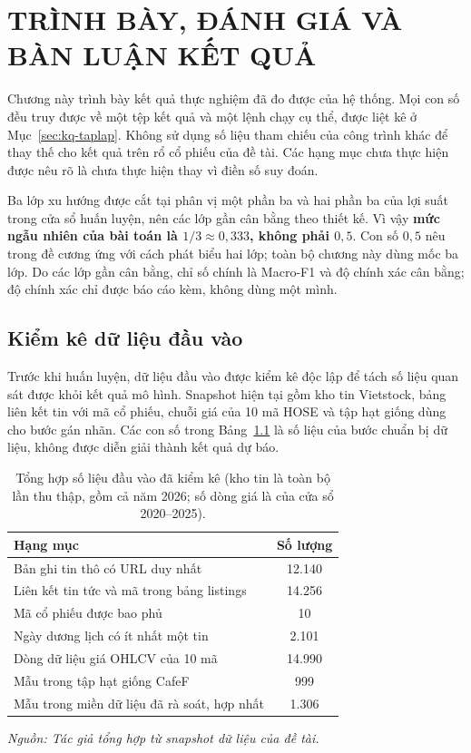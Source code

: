 \chapter{TRÌNH BÀY, ĐÁNH GIÁ VÀ BÀN LUẬN KẾT QUẢ}
\label{ch:ket-qua}

Chương này trình bày kết quả thực nghiệm đã đo được của hệ thống. Mọi con số đều truy
được về một tệp kết quả và một lệnh chạy cụ thể, được liệt kê ở
Mục~\ref{sec:kq-taplap}. Không sử dụng số liệu tham chiếu của công trình khác để thay
thế cho kết quả trên rổ cổ phiếu của đề tài. Các hạng mục chưa thực hiện được nêu rõ là
chưa thực hiện thay vì điền số suy đoán.

Ba lớp xu hướng được cắt tại phân vị một phần ba và hai phần ba của lợi suất trong cửa
sổ huấn luyện, nên các lớp gần cân bằng theo thiết kế. Vì vậy \textbf{mức ngẫu nhiên của
bài toán là $1/3 \approx 0{,}333$, không phải $0{,}5$}. Con số $0{,}5$ nêu trong đề cương
ứng với cách phát biểu hai lớp; toàn bộ chương này dùng mốc ba lớp. Do các lớp gần cân
bằng, chỉ số chính là Macro-F1 và độ chính xác cân bằng; độ chính xác chỉ được báo cáo kèm, không
dùng một mình.

\section{Kiểm kê dữ liệu đầu vào}
\label{sec:kq-snapshot}

Trước khi huấn luyện, dữ liệu đầu vào được kiểm kê độc lập để tách số liệu quan sát
được khỏi kết quả mô hình. Snapshot hiện tại gồm kho tin Vietstock, bảng liên kết tin
với mã cổ phiếu, chuỗi giá của 10 mã HOSE và tập hạt giống dùng cho bước gán nhãn.
Các con số trong Bảng~\ref{tab:kq-snapshot} là số liệu của bước chuẩn bị dữ liệu, không
được diễn giải thành kết quả dự báo.

\begin{table}[H]
  \centering
  \caption{Tổng hợp số liệu đầu vào đã kiểm kê (kho tin là toàn bộ lần thu thập, gồm cả năm 2026; số dòng giá là của cửa sổ 2020--2025).}
  \label{tab:kq-snapshot}
  \begin{tabular}{p{8.8cm} c}
    \toprule
    Hạng mục & Số lượng \\
    \midrule
    Bản ghi tin thô có URL duy nhất & 12.140 \\
    Liên kết tin tức và mã trong bảng listings & 14.256 \\
    Mã cổ phiếu được bao phủ & 10 \\
    Ngày dương lịch có ít nhất một tin & 2.101 \\
    Dòng dữ liệu giá OHLCV của 10 mã & 14.990 \\
    Mẫu trong tập hạt giống CafeF & 999 \\
    Mẫu trong miền dữ liệu đã rà soát, hợp nhất & 1.306 \\
    \bottomrule
  \end{tabular}
\noindent\textit{Nguồn: Tác giả tổng hợp từ snapshot dữ liệu của đề tài.}
\end{table}

